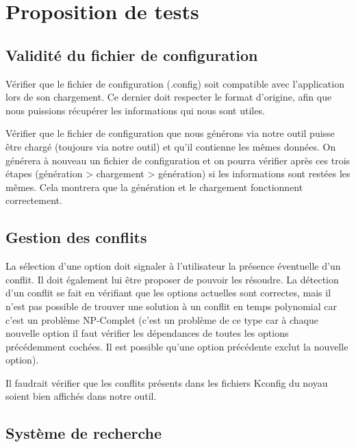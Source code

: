 \documentclass[16pts]{report}
\begin{document}

\nocite{*}


\chapter{Proposition de tests}
\label{cha:Proposition de tests}

\section{Validité du fichier de configuration}
\label{sec:Validité du fichier de configuration}

Vérifier que le fichier de configuration (.config) soit compatible avec
l’application lors de son chargement. Ce dernier doit respecter le format
d’origine, afin que nous puissions récupérer les informations qui nous sont
utiles.

Vérifier que le fichier de configuration que nous générons via notre outil
puisse être chargé (toujours via notre outil) et qu’il contienne les mêmes
données. On générera à nouveau un fichier de configuration et on pourra
vérifier après ces trois étapes (génération > chargement > génération) si les
informations sont restées les mêmes. Cela montrera que la génération et le
chargement fonctionnent correctement.

\section{Gestion des conflits}
\label{sec:Gestion des conflits}

La sélection d’une option doit signaler à l’utilisateur la présence éventuelle
d’un conflit. Il doit également lui être proposer de pouvoir les résoudre. La
détection d’un conflit se fait en vérifiant que les options actuelles sont
correctes, mais il n’est pas possible de trouver une solution à un conflit en
temps polynomial car c’est un problème NP-Complet (c’est un problème de ce type
car à chaque nouvelle option il faut vérifier les dépendances de toutes les
options précédemment cochées. Il est possible qu’une option précédente exclut
la nouvelle option).

Il faudrait vérifier que les conflits présents dans les fichiers Kconfig du
noyau soient bien affichés dans notre outil.

\section{Système de recherche}
\label{sec:Système de recherche}
\end{document}
